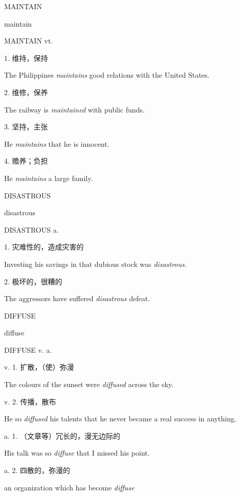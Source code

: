 \begin{flashcard}{
MAINTAIN

maintain
}
\begin{center}
MAINTAIN vt. 
\end{center}
1. 维持，保持

The Philippines \textit{maintains} good relations with the United States.

2. 维修，保养

The railway is \textit{maintained} with public funds.

3. 坚持，主张

He \textit{maintains} that he is innocent.

4. 赡养；负担

He \textit{maintains} a large family.

\end{flashcard}
\begin{flashcard}{
DISASTROUS

disastrous
}
\begin{center}
DISASTROUS a. 
\end{center}
1. 灾难性的，造成灾害的

Investing his savings in that dubious stock was \textit{disastrous}.

2. 极坏的，很糟的

The aggressors have suffered \textit{disastrous} defeat.

\end{flashcard}
\begin{flashcard}{
DIFFUSE

diffuse
}
\begin{center}
DIFFUSE v. a. 
\end{center}
v. 1. 扩散，（使）弥漫

The colours of the sunset were \textit{diffused} across the sky.

v. 2. 传播，散布

He so \textit{diffused} his talents that he never became a real success in anything.

a. 1. （文章等）冗长的，漫无边际的

His talk was so \textit{diffuse} that I missed his point.

a. 2. 四散的，弥漫的

an organization which has become \textit{diffuse}

\end{flashcard}
